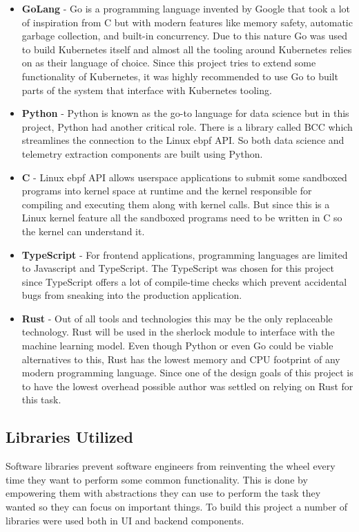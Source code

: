 \begin{itemize}[noitemsep,nolistsep] 
    \item \textbf{GoLang} - Go is a programming language invented by Google that took a lot of inspiration from C but with modern features like memory safety, automatic garbage collection, and built-in concurrency. Due to this nature Go was used to build Kubernetes itself and almost all the tooling around Kubernetes relies on as their language of choice. Since this project tries to extend some functionality of Kubernetes, it was highly recommended to use Go to built parts of the system that interface with Kubernetes tooling.
    \item \textbf{Python} - Python is known as the go-to language for data science but in this project, Python had another critical role. There is a library called BCC which streamlines the connection to the Linux \ac{ebpf} API. So both data science and telemetry extraction components are built using Python.
    \item \textbf{C} - Linux \ac{ebpf} API allows userspace applications to submit some sandboxed programs into kernel space at runtime and the kernel responsible for compiling and executing them along with kernel calls. But since this is a Linux kernel feature all the sandboxed programs need to be written in C so the kernel can understand it.
    \item \textbf{TypeScript} - For frontend applications, programming languages are limited to Javascript and TypeScript. The TypeScript was chosen for this project since TypeScript offers a lot of compile-time checks which prevent accidental bugs from sneaking into the production application.
    \item \textbf{Rust} - Out of all tools and technologies this may be the only replaceable technology. Rust will be used in the \ac{sherlock} module to interface with the machine learning model. Even though Python or even Go could be viable alternatives to this, Rust has the lowest memory and CPU footprint of any modern programming language. Since one of the design goals of this project is to have the lowest overhead possible author was settled on relying on Rust for this task.
\end{itemize}



\subsection{Libraries Utilized}
Software libraries prevent software engineers from reinventing the wheel every time they want to perform some common functionality. This is done by empowering them with abstractions they can use to perform the task they wanted so they can focus on important things. To build this project a number of libraries were used both in UI and backend components.



